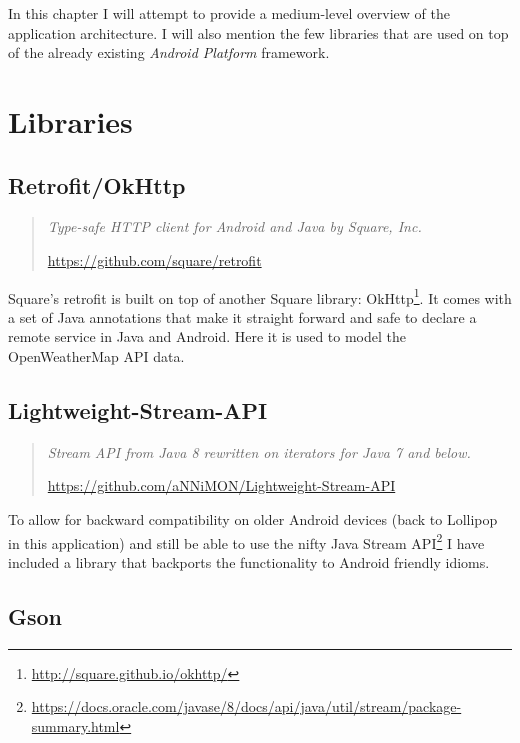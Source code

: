 \documentclass[english,a4paper,]{report}
\DeclareRobustCommand{\href}[2]{#2\footnote{\url{#1}}}
\begin{document}
In this chapter I will attempt to provide a medium-level overview of the
application architecture. I will also mention the few libraries that are
used on top of the already existing \emph{Android Platform} framework.

\hypertarget{libraries}{%
\section{Libraries}\label{libraries}}

\hypertarget{retrofitokhttp}{%
\subsection{Retrofit/OkHttp}\label{retrofitokhttp}}

\begin{quote}
\emph{Type-safe HTTP client for Android and Java by Square, Inc.}

\url{https://github.com/square/retrofit}
\end{quote}

Square's retrofit is built on top of another Square library:
\href{http://square.github.io/okhttp/}{OkHttp}. It comes with a set of
Java annotations that make it straight forward and safe to declare a
remote service in Java and Android. Here it is used to model the
OpenWeatherMap API data.

\hypertarget{lightweight-stream-api}{%
\subsection{Lightweight-Stream-API}\label{lightweight-stream-api}}

\begin{quote}
\emph{Stream API from Java 8 rewritten on iterators for Java 7 and
below.}

\url{https://github.com/aNNiMON/Lightweight-Stream-API}
\end{quote}

To allow for backward compatibility on older Android devices (back to
Lollipop in this application) and still be able to use the nifty
\href{https://docs.oracle.com/javase/8/docs/api/java/util/stream/package-summary.html}{Java
Stream API} I have included a library that backports the functionality
to Android friendly idioms.

\hypertarget{gson}{%
\subsection{Gson}\label{gson}}
\end{document}
